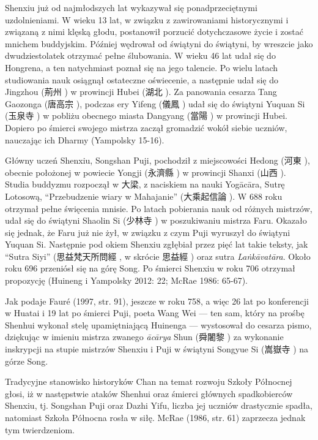 Shenxiu już od najmłodszych lat wykazywał się ponadprzeciętnymi uzdolnieniami.
W wieku 13 lat, w związku z zawirowaniami historycznymi i związaną z nimi klęską głodu, postanowił porzucić dotychczasowe życie i zostać mnichem buddyjskim.
Później wędrował od świątyni do świątyni, by wreszcie jako dwudziestolatek otrzymać pełne ślubowania.
W wieku 46 lat udał się do Hongrena, a ten natychmiast poznał się na jego talencie.
Po wielu latach studiowania nauk osiągnął ostateczne oświecenie, a następnie udał się do Jingzhou (荊州 ) w prowincji Hubei (湖北 ).
Za panowania cesarza Tang Gaozonga (唐高宗 ), podczas ery Yifeng (儀鳳 ) udał się do świątyni Yuquan Si (玉泉寺 ) w pobliżu obecnego miasta Dangyang (當陽 ) w prowincji Hubei.
Dopiero po śmierci swojego mistrza zaczął gromadzić wokół siebie uczniów, nauczając ich Dharmy
(Yampolsky 15-16).

Główny uczeń Shenxiu, Songshan Puji, pochodził z miejscowości Hedong (河東 ), obecnie położonej w powiecie Yongji (永濟縣 ) w prowincji Shanxi (山西 ).
Studia buddyzmu rozpoczął w 大梁, z naciskiem na nauki Yogācāra, Sutrę Lotosową, ``Przebudzenie wiary w Mahajanie'' (大乘起信論 ).
W 688 roku otrzymał pełne święcenia mnisie.
Po latach pobierania nauk od różnych mistrzów, udał się do świątyni Shaolin Si (少林寺 ) w poszukiwaniu mistrza Faru.
Okazało się jednak, że Faru już nie żył, w związku z czym Puji wyruszył do świątyni Yuquan Si.
Następnie pod okiem Shenxiu zgłębiał przez pięć lat takie teksty, jak ``Sutra Siyi'' (思益梵天所問經 , w skrócie 思益經 ) oraz sutra \textit{La\.nkā\-vatāra}.
Około roku 696 przeniósł się na górę Song.
Po śmierci Shenxiu w roku 706 otrzymał propozycję %
(Huineng i Yampolsky 2012: 22; McRae 1986: 65-67).

Jak podaje Fauré (1997, str. 91), jeszcze w roku 758, a więc 26 lat po konferencji w Huatai i 19 lat po śmierci Puji, poeta Wang Wei --- ten sam, który na prośbę Shenhui wykonał stelę upamiętniającą Huinenga --- wystosował do cesarza pismo, dziękując w imieniu mistrza zwanego \textit{ācārya} Shun (舜闍黎 ) za wykonanie inskrypcji na stupie mistrzów Shenxiu i Puji w świątyni Songyue Si (嵩嶽寺 ) na górze Song.

Tradycyjne stanowisko historyków Chan na temat rozwoju Szkoły Północnej głosi, iż w następstwie ataków Shenhui oraz śmierci głównych spadkobierców Shenxiu, tj. Songshan Puji oraz Dazhi Yifu, liczba jej uczniów drastycznie spadła, natomiast Szkoła Północna rosła w siłę.
McRae (1986, str. 61) zaprzecza jednak tym twierdzeniom.

